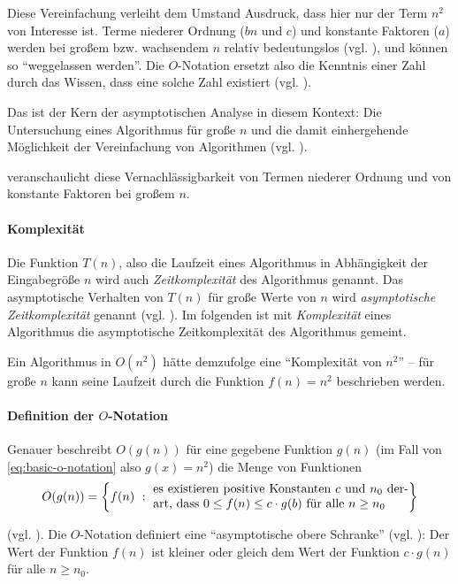 Diese Vereinfachung verleiht dem Umstand Ausdruck, dass hier nur der Term $n^2$ von Interesse ist. Terme niederer Ordnung ($bn$ und $c$) und konstante Faktoren ($a$) werden bei großem bzw. wachsendem $n$ relativ bedeutungslos (vgl. \cite[28]{clrs2001}), und können so \enquote{weggelassen werden}. Die $O$-Notation ersetzt also die Kenntnis einer Zahl durch das Wissen, dass eine solche Zahl existiert (vgl. \cite[3]{bru1958}).

Das ist der Kern der asymptotischen Analyse in diesem Kontext: Die Untersuchung eines Algorithmus für große $n$ und die damit einhergehende Möglichkeit der Vereinfachung von Algorithmen (vgl. \cite[63]{sha2011}).



 veranschaulicht diese Vernachlässigbarkeit von Termen niederer Ordnung und von konstante Faktoren bei großem $n$.

\paragraph{Komplexität} Die Funktion $T(n)$, also die Laufzeit eines Algorithmus in Abhängigkeit der Eingabegröße $n$ wird auch \emph{Zeitkomplexität} des Algorithmus genannt. Das asymptotische Verhalten von $T(n)$ für große Werte von $n$ wird \emph{asymptotische Zeitkomplexität} genannt (vgl. \cite[2]{ahu1974}). Im folgenden ist mit \emph{Komplexität} eines Algorithmus die asymptotische Zeitkomplexität des Algorithmus gemeint.

Ein Algorithmus in $O(n^2)$ hätte demzufolge eine \enquote{Komplexität von $n^2$} -- für große $n$ kann seine Laufzeit durch die Funktion $f(n) = n^2$ beschrieben werden.

\paragraph{Definition der $O$-Notation}

Genauer beschreibt $O(g(n))$ für eine gegebene Funktion $g(n)$ (im Fall von \eqref{eq:basic-o-notation} also $g(x) = n^2$) die Menge von Funktionen
%
\begin{equation*}
    O(g(n))=\left\{
        f(n)\ :\ \parbox{.6\textwidth}{
            es existieren positive Konstanten $c$ und $n_0$ derart, dass $0 \leq f(n) \leq c \cdot g(b)$ für alle $n \geq n_0$
        }
    \right\}
\end{equation*}

(vgl. \cite[37]{meh1984}). Die $O$-Notation definiert eine \enquote{asymptotische obere Schranke} (vgl. \cite[64]{sha2011}): Der Wert der Funktion $f(n)$ ist kleiner oder gleich dem Wert der Funktion $c \cdot g(n)$ für alle $n \geq n_0$.

